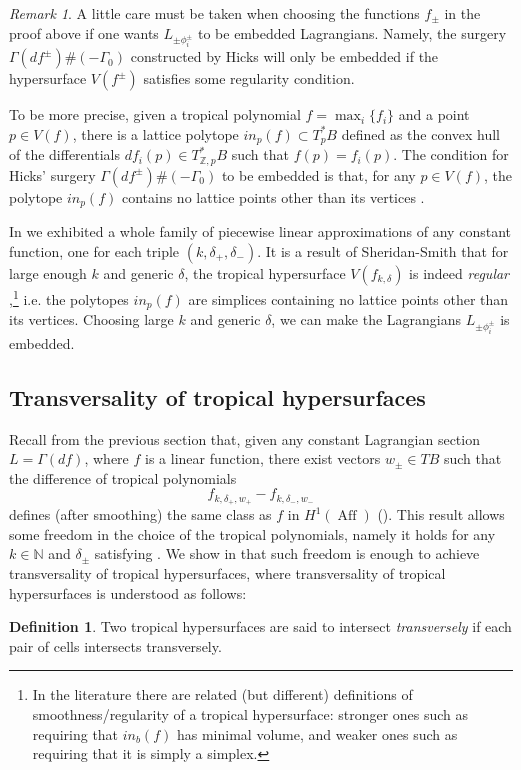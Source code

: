 \documentclass[10pt]{amsart}
\theoremstyle{definition}
\newtheorem{defn}[thm]{Definition}
\theoremstyle{remark}
\newtheorem{remark}[thm]{Remark}
\def\N{\mathbb{N}}
\def\Z{\mathbb{Z}}
\DeclareMathOperator{\Aff}{Aff}
\begin{document}
\begin{remark}
    A little care must be taken when choosing the functions $f_\pm$ in the proof above if one wants $L_{\pm \phi_i^\pm}$ to be embedded Lagrangians.
    Namely, the surgery $\Gamma(df^\pm)\#(-\Gamma_0)$ constructed by Hicks will only be embedded if the hypersurface $V(f^\pm)$ satisfies some regularity condition.
    
    To be more precise, given a tropical polynomial $f = \max_i \{f_i\}$ and a point $p \in V(f)$, there is a lattice polytope $in_p(f) \subset T^*_p B$ defined as the convex hull of the differentials $df_i(p) \in T^*_{\Z,p} B$ such that $f(p) = f_i(p)$. 
    The condition for Hicks' surgery $\Gamma(df^\pm)\#(-\Gamma_0)$ to be embedded is that, for any $p\in V(f)$, the polytope $in_p(f)$ contains no lattice points other than its vertices \cite[Theorem 3.17]{hicks2020tropical}.

    In  we exhibited a whole family of piecewise linear approximations of any constant function, one for each triple $(k,\delta_+,\delta_-)$.
    It is a result of Sheridan-Smith that for large enough $k$ and generic $\delta$, the tropical hypersurface $V(f_{k,\delta})$ is indeed \emph{regular} \cite[Lemma 3.24]{sheridan2021lagrangian},\footnote{In the literature there are related (but different) definitions of smoothness/regularity of a tropical hypersurface: stronger ones such as requiring that $in_b(f)$ has minimal volume, and weaker ones such as requiring that it is simply a simplex.} i.e. the polytopes $in_p(f)$ are simplices containing no lattice points other than its vertices. 
    Choosing large $k$ and generic $\delta$, we can make the Lagrangians $L_{\pm \phi_i^\pm}$  is embedded.
\end{remark}

 \subsection{Transversality of tropical hypersurfaces}
Recall from the previous section that, given any constant Lagrangian section $L = \Gamma(df)$, where $f$ is a linear function, there exist vectors $w_\pm \in TB$ such that the difference of tropical polynomials
$$
    f_{k,\delta_+,w_+} - f_{k,\delta_-,w_-}
$$
defines (after smoothing) the same class as $f$ in $H^1(\Aff)$ ().
This result allows some freedom in the choice of the tropical polynomials, namely it holds for any $k \in \N$ and $\delta_\pm$  satisfying .
We show in  that such freedom is enough to achieve transversality of tropical hypersurfaces, where transversality of tropical hypersurfaces is understood as follows:
\begin{defn}
    Two tropical hypersurfaces are said to intersect 
    \emph{transversely} if each pair of cells intersects transversely.
\end{defn}
\end{document}
